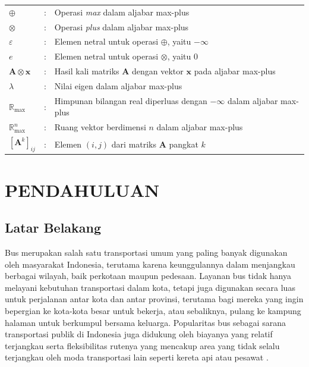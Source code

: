 \documentclass{file/TA-ITS}
\theoremstyle{definition}
\theoremstyle{definition}
\theoremstyle{plain}
\begin{document}
\DaftarSimbol
\begin{flushleft}
\begin{tabular}{lrl}

$\oplus$ &:& Operasi \textit{max} dalam aljabar max-plus \\

$\otimes$ &:& Operasi \textit{plus} dalam aljabar max-plus \\

$\varepsilon$ &:& Elemen netral untuk operasi $\oplus$, yaitu $-\infty$ \\

$e$ &:& Elemen netral untuk operasi $\otimes$, yaitu $0$ \\

$\mathbf{A} \otimes \mathbf{x}$ &:& Hasil kali matriks $\mathbf{A}$ dengan vektor $\mathbf{x}$ pada aljabar max-plus \\

$\lambda$ &:& Nilai eigen dalam aljabar max-plus \\

$\mathbb{R}_{\max}$ &:& Himpunan bilangan real diperluas dengan $-\infty$ dalam aljabar max-plus \\

$\mathbb{R}_{\max}^n$ &:& Ruang vektor berdimensi $n$ dalam aljabar max-plus \\

$[\mathbf{A}^k]_{ij}$ &:& Elemen $(i,j)$ dari matriks $\mathbf{A}$ pangkat $k$ \\

\end{tabular}
\end{flushleft}

\BagianInti

\chapter{PENDAHULUAN}
\section{Latar Belakang}
\indent Bus merupakan salah satu transportasi umum yang paling banyak digunakan oleh masyarakat Indonesia, terutama karena keunggulannya dalam menjangkau berbagai wilayah, baik perkotaan maupun pedesaan. Layanan bus tidak hanya melayani kebutuhan transportasi dalam kota, tetapi juga digunakan secara luas untuk perjalanan antar kota dan antar provinsi, terutama bagi mereka yang ingin bepergian ke kota-kota besar untuk bekerja, atau sebaliknya, pulang ke kampung halaman untuk berkumpul bersama keluarga. Popularitas bus sebagai sarana transportasi publik di Indonesia juga didukung oleh biayanya yang relatif terjangkau serta fleksibilitas rutenya yang mencakup area yang tidak selalu terjangkau oleh moda transportasi lain seperti kereta api atau pesawat \cite{Arum2015}.
\end{document}
